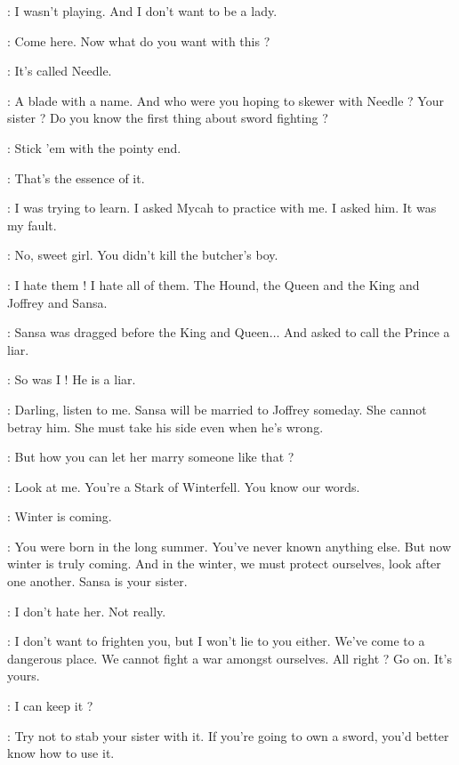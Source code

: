 \ARYA: I wasn't playing. And I don't want to be a lady. 

\NED: Come here. Now what do you want with this ? 

\ARYA: It's called Needle. 

\NED: A blade with a name. And who were you hoping to skewer with Needle ? Your sister ? Do you know the first thing about sword fighting ? 

\ARYA: Stick 'em with the pointy end. 

\NED: That's the essence of it. 

\ARYA: I was trying to learn. I asked Mycah to practice with me. I asked him. It was my fault. 

\NED: No, sweet girl. You didn't kill the butcher's boy. 

\ARYA: I hate them ! I hate all of them. The Hound, the Queen and the King and Joffrey and Sansa. 

\NED: Sansa was dragged before the King and Queen$\ldots$ And asked to call the Prince a liar. 

\ARYA: So was I ! He is a liar. 

\NED: Darling, listen to me. Sansa will be married to Joffrey someday. She cannot betray him. She must take his side even when he's wrong. 

\ARYA: But how you can let her marry someone like that ? 

\NED: Look at me. You're a Stark of Winterfell. You know our words. 

\ARYA: Winter is coming. 

\NED: You were born in the long summer. You've never known anything else. But now winter is truly coming. And in the winter, we must protect ourselves, look after one another. Sansa is your sister. 

\ARYA: I don't hate her. Not really. 

\NED: I don't want to frighten you, but I won't lie to you either. We've come to a dangerous place. We cannot fight a war amongst ourselves. All right ?  Go on. It's yours. 

\ARYA: I can keep it ? 

\NED: Try not to stab your sister with it. If you're going to own a sword, you'd better know how to use it. 

\scene



